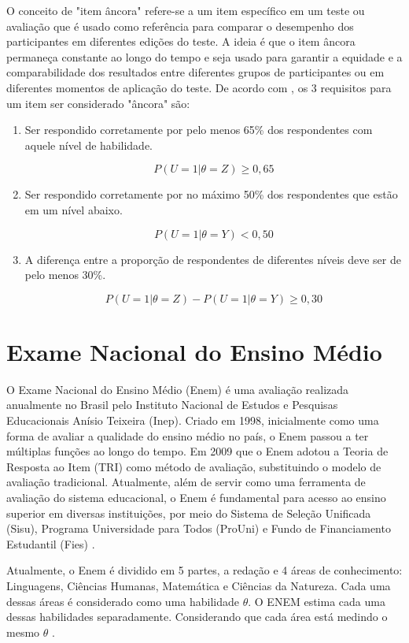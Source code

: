 O conceito de "item âncora" refere-se a um item específico em um teste ou avaliação que é usado como referência para comparar o desempenho dos participantes em diferentes edições do teste. A ideia é que o item âncora permaneça constante ao longo do tempo e seja usado para garantir a equidade e a comparabilidade dos resultados entre diferentes grupos de participantes ou em diferentes momentos de aplicação do teste. De acordo com , os 3 requisitos para um item ser considerado "âncora" são:

\begin{enumerate}
	\item Ser respondido corretamente por pelo menos 65\% dos respondentes com aquele nível de habilidade.
	
	\[
	P(U = 1| \theta = Z ) \geq 0,65
	\]
	
	\item Ser respondido corretamente por no máximo 50\% dos respondentes que estão em um nível abaixo.
	
	\[
	P(U = 1| \theta = Y ) < 0,50
	\]
	
	\item A diferença entre a proporção de respondentes de diferentes níveis deve ser de pelo menos 30\%.
	
	\[
	P(U = 1| \theta = Z ) - P(U = 1| \theta = Y ) \geq  0,30
	\]
\end{enumerate}



\section{Exame Nacional do Ensino Médio}

O Exame Nacional do Ensino Médio (Enem) é uma avaliação realizada anualmente no Brasil pelo Instituto Nacional de Estudos e Pesquisas Educacionais Anísio Teixeira (Inep). Criado em 1998, inicialmente como uma forma de avaliar a qualidade do ensino médio no país, o Enem passou a ter múltiplas funções ao longo do tempo. Em 2009 que o Enem adotou a Teoria de Resposta ao Item (TRI) como método de avaliação, substituindo o modelo de avaliação tradicional. Atualmente, além de servir como uma ferramenta de avaliação do sistema educacional, o Enem é fundamental para acesso ao ensino superior em diversas instituições, por meio do Sistema de Seleção Unificada (Sisu), Programa Universidade para Todos (ProUni) e Fundo de Financiamento Estudantil (Fies) \cite{inephistorico}.

Atualmente, o Enem é dividido em 5 partes, a redação e 4 áreas de conhecimento: Linguagens, Ciências Humanas, Matemática e Ciências da Natureza. Cada uma dessas áreas é considerado como uma habilidade $\theta$. O ENEM estima cada uma dessas habilidades separadamente. Considerando que cada área está medindo o mesmo $\theta$ \cite{inep2021}.





